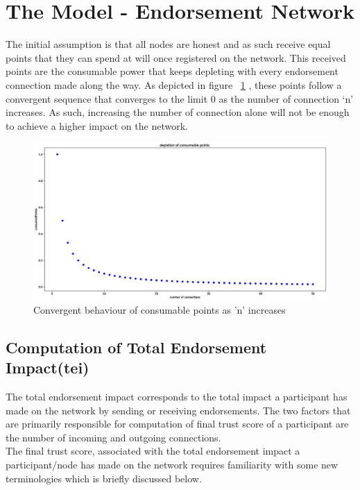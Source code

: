 \section{The Model - Endorsement Network}
The initial assumption is that all nodes are honest and as such receive equal
points that they can spend at will once registered on the network. This received
points are the consumable power that keeps depleting with every endorsement
connection made along the way. As depicted in figure ~\ref{consumablePoint} ,
these points follow a convergent sequence that converges to the limit 0 as the
number of connection `n' increases. As such, increasing the number of
connection alone will not be enough to achieve a higher impact on the network.
\begin{figure}
	\centering
	\includegraphics[width=1.0\textwidth]{Images/ConsumablePoints.eps}
	\caption{Convergent behaviour of consumable points as 'n' increases}
	\label{consumablePoint}
\end{figure}

\subsection{Computation of Total Endorsement Impact(tei)} 
The total endorsement impact corresponds to the total impact a participant has
made on the network by sending or receiving endorsements. The two factors that
are primarily responsible for computation of final trust score of a participant
are the number of incoming and outgoing connections. \\

The final trust score, associated with the total endorsement impact a
participant/node has made on the network requires familiarity with some new
terminologies which is briefly discussed below. \\

